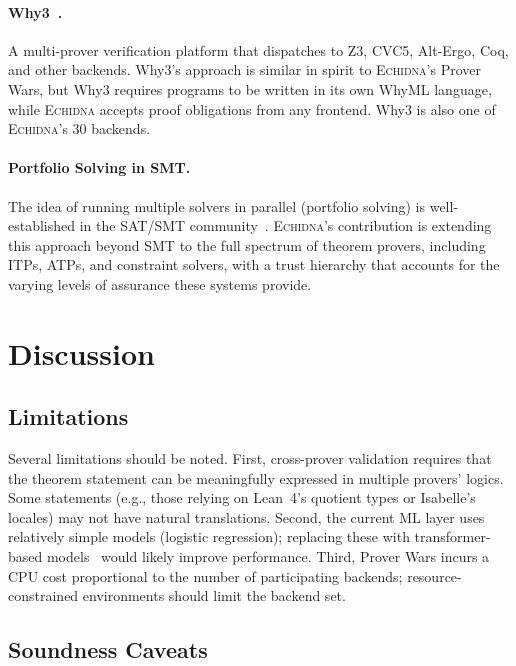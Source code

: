 \documentclass[11pt,a4paper]{article}
\newcommand{\echidna}{\textsc{Echidna}}
\begin{document}
\paragraph{Why3~\citep{why3}.}
A multi-prover verification platform that dispatches to Z3, CVC5, Alt-Ergo,
Coq, and other backends. Why3's approach is similar in spirit to \echidna{}'s
Prover Wars, but Why3 requires programs to be written in its own WhyML
language, while \echidna{} accepts proof obligations from any frontend. Why3 is
also one of \echidna{}'s 30 backends.

\paragraph{Portfolio Solving in SMT.}
The idea of running multiple solvers in parallel (portfolio solving) is
well-established in the SAT/SMT community~\citep{portfolio}. \echidna{}'s
contribution is extending this approach beyond SMT to the full spectrum of
theorem provers, including ITPs, ATPs, and constraint solvers, with a
trust hierarchy that accounts for the varying levels of assurance these
systems provide.


\section{Discussion}
\label{sec:discussion}

\subsection{Limitations}

Several limitations should be noted. First, cross-prover validation requires
that the theorem statement can be meaningfully expressed in multiple provers'
logics. Some statements (e.g., those relying on Lean~4's quotient types or
Isabelle's locales) may not have natural translations. Second, the current ML
layer uses relatively simple models (logistic regression); replacing these
with transformer-based models~\citep{reprover} would likely improve
performance. Third, Prover Wars incurs a CPU cost proportional to the number
of participating backends; resource-constrained environments should limit the
backend set.

\subsection{Soundness Caveats}
\end{document}
